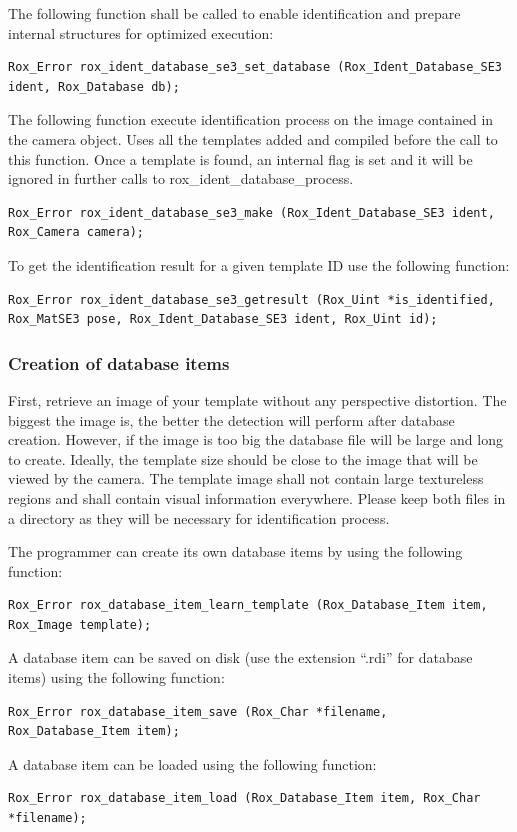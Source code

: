 \noindent The following function shall be called to enable
identification and prepare internal structures for optimized
execution:
\begin{lstlisting}
Rox_Error rox_ident_database_se3_set_database (Rox_Ident_Database_SE3 ident, Rox_Database db);
\end{lstlisting}

\noindent The following function execute identification process on the
image contained in the camera object. Uses all the templates added and
compiled before the call to this function. Once a template is found,
an internal flag is set and it will be ignored in further calls to
rox\_ident\_database\_process.
\begin{lstlisting}
Rox_Error rox_ident_database_se3_make (Rox_Ident_Database_SE3 ident, Rox_Camera camera);
\end{lstlisting}

\noindent To get the identification result for a given template ID use the following function: 

\begin{lstlisting}
Rox_Error rox_ident_database_se3_getresult (Rox_Uint *is_identified, Rox_MatSE3 pose, Rox_Ident_Database_SE3 ident, Rox_Uint id); 
\end{lstlisting}

\subsubsection{Creation of database items}

\noindent First, retrieve an image of your template without any perspective distortion. The biggest the image is, the better the detection will perform after database creation. However, if the image is too big the database file will be large and long to create. Ideally, the template size should be close to the image that will be viewed by the camera. The template image shall not contain large textureless regions and shall contain visual information everywhere. Please keep both files in a directory as they will be necessary for identification process.

The programmer can create its own database items by using the following function:
\begin{lstlisting}
Rox_Error rox_database_item_learn_template (Rox_Database_Item item, Rox_Image template); 
\end{lstlisting}

A database item can be saved on disk (use the extension ``.rdi'' for database items) using the following function:
\begin{lstlisting}
Rox_Error rox_database_item_save (Rox_Char *filename, Rox_Database_Item item);
\end{lstlisting}
A database item can be loaded using the following function:
\begin{lstlisting}
Rox_Error rox_database_item_load (Rox_Database_Item item, Rox_Char *filename);
\end{lstlisting}

